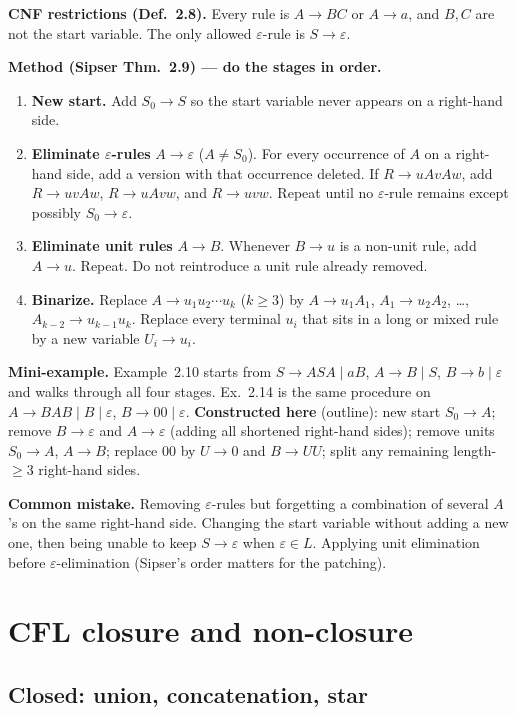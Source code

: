 \documentclass[11pt,a4paper]{article}
\newcommand{\eps}{\varepsilon}
\begin{document}
\textbf{CNF restrictions (Def.~2.8).}
Every rule is $A\to BC$ or $A\to a$, and $B,C$ are not the start
variable. The only allowed $\eps$-rule is $S\to\eps$.

\textbf{Method (Sipser Thm.~2.9) --- do the stages in order.}
\begin{enumerate}
  \item \textbf{New start.} Add $S_0\to S$ so the start variable
        never appears on a right-hand side.
  \item \textbf{Eliminate $\eps$-rules} $A\to\eps$ ($A\neq S_0$).
        For every occurrence of $A$ on a right-hand side, add a
        version with that occurrence deleted. If $R\to uAvAw$, add
        $R\to uvAw$, $R\to uAvw$, and $R\to uvw$. Repeat until no
        $\eps$-rule remains except possibly $S_0\to\eps$.
  \item \textbf{Eliminate unit rules} $A\to B$. Whenever $B\to u$
        is a non-unit rule, add $A\to u$. Repeat. Do not reintroduce
        a unit rule already removed.
  \item \textbf{Binarize.} Replace $A\to u_1u_2\cdots u_k$ ($k\ge 3$)
        by $A\to u_1A_1$, $A_1\to u_2A_2$, \ldots,
        $A_{k-2}\to u_{k-1}u_k$. Replace every terminal $u_i$ that
        sits in a long or mixed rule by a new variable $U_i\to u_i$.
\end{enumerate}

\textbf{Mini-example.}
Example~2.10 starts from $S\to ASA\mid aB$, $A\to B\mid S$,
$B\to b\mid\eps$ and walks through all four stages. Ex.~2.14 is the
same procedure on $A\to BAB\mid B\mid\eps$, $B\to 00\mid\eps$.
\textbf{Constructed here} (outline): new start $S_0\to A$; remove
$B\to\eps$ and $A\to\eps$ (adding all shortened right-hand sides);
remove units $S_0\to A$, $A\to B$; replace $00$ by $U\to 0$ and
$B\to UU$; split any remaining length-${\ge}3$ right-hand sides.

\textbf{Common mistake.}
Removing $\eps$-rules but forgetting a combination of several $A$'s
on the same right-hand side. Changing the start variable without
adding a new one, then being unable to keep $S\to\eps$ when
$\eps\in L$. Applying unit elimination before $\eps$-elimination
(Sipser's order matters for the patching).

\section{CFL closure and non-closure}
\label{type:cfl-closure}

\subsection{Closed: union, concatenation, star}
\end{document}
